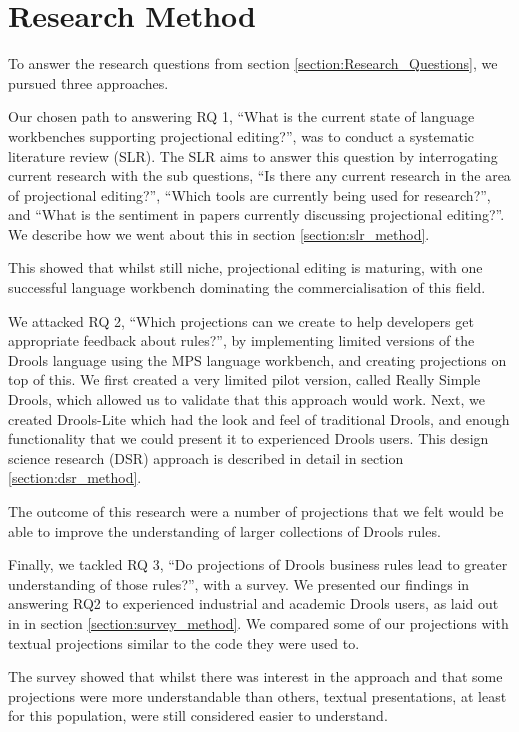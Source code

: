 \section{Research Method}
\label{section:Research_Method}

To answer the research questions from section \ref{section:Research_Questions}, we pursued three approaches.

Our chosen path to answering RQ 1, ``What is the current state of language workbenches supporting projectional editing?'', was to conduct a systematic literature review (SLR).
The SLR aims to answer this question by interrogating current research with the sub questions, ``Is there any current research in the area of projectional editing?'',  ``Which tools are currently being used for research?'', and ``What is the sentiment in papers currently discussing projectional editing?''.
We describe how we went about this in section \ref{section:slr_method}. 

This showed that whilst still niche, projectional editing is maturing, with one successful language workbench dominating the commercialisation of this field.

We attacked RQ 2, ``Which projections can we create to help developers get appropriate feedback about rules?'', by implementing limited versions of the Drools language using the MPS language workbench, and creating projections on top of this.
We first created a very limited pilot version, called Really Simple Drools, which allowed us to validate that this approach would work.
Next, we created Drools-Lite which had the look and feel of traditional Drools, and enough functionality that we could present it to experienced Drools users.
This design science research (DSR) approach is described in detail in section \ref{section:dsr_method}.

The outcome of this research were a number of projections that we felt would be able to improve the understanding of larger collections of Drools rules.

Finally, we tackled RQ 3, ``Do projections of Drools business rules lead to greater understanding of those rules?'', with a survey.
We presented our findings in answering RQ2 to experienced industrial and academic Drools users, as laid out in in section \ref{section:survey_method}.
We compared some of our projections with textual projections similar to the code they were used to.

The survey showed that whilst there was interest in the approach and that some projections were more understandable than others, textual presentations, at least for this population, were still considered easier to understand.